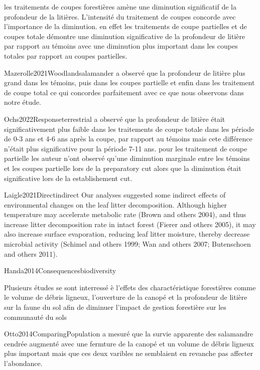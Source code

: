 
les traitements de coupes forestières amène une diminution significatif de la profondeur de la litières. 
L'intensité du traitement de coupes concorde avec l'importance de la diminution. 
en effet les traitements de coupe partielles et de coupes totale démontre une diminution significative de la profondeur de litière par rapport au témoins 
avec une diminution plus important dans les coupes totales par rapport au coupes partielles.

Mazerolle2021Woodlandsalamander a observé que la profondeur de litière plus grand dans les témoins, puis dans les coupes partielle 
et enfin dans les traitement de coupe total ce qui concordes parfaitement avec ce que nous observons dans notre étude.

Ochs2022Responseterrestrial a observé que la profondeur de litière était significativement plus faible dans les traitements de coupe totale dans les période de 0-3 ans et 4-6 ans après la coupe, par rapport au témoins mais cete différence n'était plus significative pour la période 7-11 ans. 
pour les traitement de coupe partielle les auteur n'ont observé qu'une diminution marginale entre les témoins et les coupes partielle lors de la preparatory cut alors que la diminution était significative lors de la establishement cut.

Laigle2021Directindirect
Our analyses suggested some indirect effects of environmental changes on the leaf litter decomposition. Although higher temperature may accelerate metabolic rate (Brown and others 2004), and thus increase litter decomposition rate in intact forest (Fierer and others 2005), it may also increase surface evaporation, reducing leaf litter moisture, thereby decrease microbial activity (Schimel and others 1999; Wan and others 2007; Butenschoen and others 2011).


Handa2014Consequencesbiodiversity


Plusieurs études se sont interressé è l'effets des charactéristique forestières comme le volume de débris ligneux, l'ouverture de la canopé et la profondeur de litière sur la faune du sol afin de diminuer l'impact de gestion forestière sur les communauté du sols \citep{Semlitsch2002Criticalelements,McKenny2006Effectsstructural}

Otto2014ComparingPopulation a mesuré que la survie apparente des salamandre cendrée augmenté avec une fermture de la canopé et un volume de débris ligneux plus important mais que ces deux varibles ne semblaient en revanche pas affecter l'abondance. 

